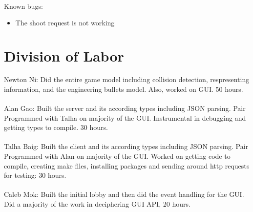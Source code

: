 \documentclass{article}
\begin{document}
    Known bugs: \\
       \begin{itemize}
   	\item  The shoot request is not working\\
    \end{itemize}

 \section{Division of Labor}
 
Newton Ni: Did the entire game model including collision detection, respresenting information, and the engineering bullets model. Also, worked on GUI. 50 hours. \\
\\ 
Alan Gao: Built the server and its according types including JSON parsing. Pair Programmed with Talha on majority of the GUI. Instrumental in debugging and getting types to compile. 30 hours.
 \\ \\
 Talha Baig: Built the client and its according types including JSON parsing. Pair Programmed with Alan on majority of the GUI. Worked on getting code to compile, creating make files, installing packages and sending around http requests for testing: 30 hours.
 \\  \\
 Caleb Mok: Built the initial lobby and then did the event handling for the GUI. Did a majority of the work in deciphering GUI API, 20 hours.
\end{document}
